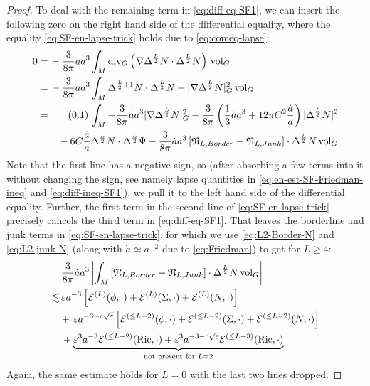 \documentclass[11pt,leqno,textwidth=10cm]{amsart}
\numberwithin{equation}{section}
\theoremstyle{definition}
\theoremstyle{plain}
\newcommand{\1}{\mathbbm{1}}
\newcommand{\E}{\mathcal{E}}
\newcommand{\Ric}{\text{\normalfont{Ric}}}
\newcommand{\vol}[1]{{\text{\normalfont{vol}}}_{#1}}
\renewcommand{\epsilon}{\varepsilon}
\newcommand{\Lap}{\Delta}
\renewcommand{\div}{\text{\normalfont{div}}}
\newcommand{\numberthis}{\addtocounter{equation}{1}\tag{\theequation}}
\renewcommand{\theequation}{\arabic{section}.\arabic{equation}}
\begin{document}
\begin{proof}
To deal with the remaining term in \eqref{eq:diff-eq-SF1}, we can insert the following zero on the right hand side of the differential equality, where the equality \eqref{eq:SF-en-lapse-trick} holds due to \eqref{eq:comeq-lapse}:
\begin{align*}
0=&\,-\frac3{8\pi}\dot{a}a^3\int_M\div_G\left(\nabla\Lap^{\frac{L}2} N\cdot \Lap^{\frac{L}2}N\right)\,\vol{G}\\
=&\,-\frac3{8\pi}\dot{a}a^3\int_M \Lap^{{\frac{L}2}+1}N\cdot\Lap^\frac{L}2N+\lvert\nabla\Lap^{\frac{L}2}N\rvert_G^2\,\vol{G}\\
=&\numberthis\label{eq:SF-en-lapse-trick}\,\int_M -\frac3{8\pi}\dot{a}a^3\lvert\nabla\Lap^{\frac{L}2}N\rvert_G^2-\frac{3}{8\pi}\left(\frac13\dot{a}a^3+12\pi C^2\frac{\dot{a}}a\right)\lvert\Lap^{\frac{L}2}N\rvert^2\\
&\quad -6 C\frac{\dot{a}}a\Lap^{\frac{L}2}N\cdot \Lap^{\frac{L}2}\Psi-\frac3{8\pi}\dot{a}a^3\left[\mathfrak{N}_{L,Border}+\mathfrak{N}_{L,Junk}\right]\cdot\Lap^{\frac{L}2}N\,\vol{G}
\end{align*}
Note that the first line has a negative sign, so (after absorbing a few terms into it without changing the sign, see namely lapse quantities in \eqref{eq:en-est-SF-Friedman-ineq} and \eqref{eq:diff-ineq-SF1}), we pull it to the left hand side of the differential equality. Further, the first term in the second line of \eqref{eq:SF-en-lapse-trick} precisely cancels the third term in \eqref{eq:diff-eq-SF1}. That leaves the borderline and junk terms in \eqref{eq:SF-en-lapse-trick}, for which we use \eqref{eq:L2-Border-N} and \eqref{eq:L2-junk-N} (along with $\dot{a}\simeq a^{-2}$ due to \eqref{eq:Friedman}) to get for $L\geq 4$:
\begin{align*}
&\,\frac{3}{8\pi}\dot{a}a^3\left\lvert\int_M\left[\mathfrak{N}_{L,Border}+\mathfrak{N}_{L,Junk}\right]\cdot\Lap^{\frac{L}2}N\,\vol{G}\right\rvert\\
\lesssim&\,\epsilon a^{-3}\left[\E^{(L)}(\phi,\cdot)+\E^{(L)}(\Sigma,\cdot)+\E^{(L)}(N,\cdot)\right]\\
&+\,\epsilon a^{-3-c\sqrt{\epsilon}}\left[\E^{(\leq L-2)}(\phi,\cdot)+\E^{(\leq L-2)}(\Sigma,\cdot)+\E^{(\leq L-2)}(N,\cdot)\right]\\
&\,+\underbrace{\epsilon^3 a^{-3}\E^{(\leq L-2)}(\Ric,\cdot)+\epsilon^3 a^{-3-c\sqrt{\epsilon}}\E^{(\leq L-3)}(\Ric,\cdot)}_{\text{not present for }L=2}
\end{align*}
Again, the same estimate holds for $L=0$ with the last two lines dropped.


\end{proof}
\end{document}
